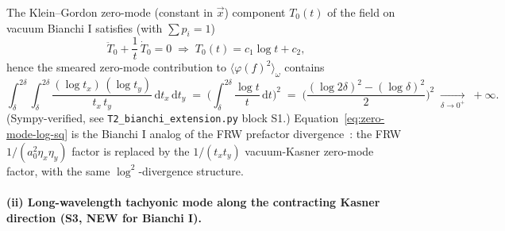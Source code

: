 \documentclass[11pt]{article}
\theoremstyle{definition}
\begin{document}
The Klein--Gordon zero-mode (constant in $\vec x$) component $T_0(t)$ of the field on vacuum Bianchi I satisfies (with $\sum p_i=1$)
\begin{equation}\label{eq:zero-mode-eq}
\ddot T_0 + \frac{1}{t}\,\dot T_0 = 0
\;\Longrightarrow\;
T_0(t) = c_1\log t + c_2,
\end{equation}
hence the smeared zero-mode contribution to $\langle\varphi(f)^2\rangle_\omega$ contains
\begin{equation}\label{eq:zero-mode-log-sq}
\int_\delta^{2\delta}\!\!\!\int_\delta^{2\delta}\!
   \frac{(\log t_x)\,(\log t_y)}{t_x\,t_y}\,\mathrm{d}t_x\,\mathrm{d}t_y
  \;=\; \biggl(\int_\delta^{2\delta}\!\frac{\log t}{t}\,\mathrm{d}t\biggr)^{\!\!2}
  \;=\; \biggl(\frac{(\log 2\delta)^2-(\log\delta)^2}{2}\biggr)^{\!\!2}
  \;\xrightarrow[\delta\to 0^+]{}\; +\infty.
\end{equation}
(Sympy-verified, see \texttt{T2\_bianchi\_extension.py} block S1.) Equation~\eqref{eq:zero-mode-log-sq} is the Bianchi I analog of the FRW prefactor divergence~\cite[CHECK~3]{algebraic_arrow}: the FRW $1/(a_0^2\eta_x\eta_y)$ factor is replaced by the $1/(t_x t_y)$ vacuum-Kasner zero-mode factor, with the same $\log^2$-divergence structure.

\paragraph{(ii) Long-wavelength tachyonic mode along the contracting Kasner direction (S3, NEW for Bianchi I).}
\end{document}
